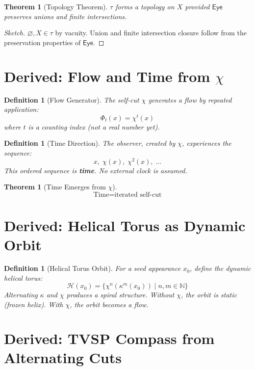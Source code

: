 \documentclass[12pt]{article}
\newtheorem{definition}[axiom]{Definition}
\newtheorem{theorem}[axiom]{Theorem}
\newcommand{\cut}{\kappa}
\newcommand{\selfcut}{\chi}
\newcommand{\eye}{\mathsf{Eye}}
\begin{document}
\begin{theorem}[Topology Theorem]
$\tau$ forms a topology on $X$ provided $\eye$ preserves unions and finite intersections.
\end{theorem}
\begin{proof}[Sketch]
$\varnothing, X \in \tau$ by vacuity.
Union and finite intersection closure follow from the preservation properties of $\eye$.
\end{proof}

\section{Derived: Flow and Time from $\selfcut$}

\begin{definition}[Flow Generator]
The self-cut $\selfcut$ generates a flow by repeated application:
\[
\Phi_t(x) = \selfcut^{t}(x)
\]
where $t$ is a counting index (not a real number yet).
\end{definition}

\begin{definition}[Time Direction]
The observer, created by $\selfcut$, experiences the sequence:
\[
x,\; \selfcut(x),\; \selfcut^2(x),\; \ldots
\]
This ordered sequence is \textbf{time}. No external clock is assumed.
\end{definition}

\begin{theorem}[Time Emerges from $\selfcut$]
\[
\boxed{\text{Time} = \text{iterated self-cut}}
\]
\end{theorem}

\section{Derived: Helical Torus as Dynamic Orbit}

\begin{definition}[Helical Torus Orbit]
For a seed appearance $x_0$, define the dynamic helical torus:
\[
\mathcal{H}(x_0) = \{ \selfcut^n(\cut^m(x_0)) \mid n,m \in \mathbb{N} \}
\]
Alternating $\cut$ and $\selfcut$ produces a spiral structure.
Without $\selfcut$, the orbit is static (frozen helix).
With $\selfcut$, the orbit becomes a flow.
\end{definition}

\section{Derived: TVSP Compass from Alternating Cuts}
\end{document}
